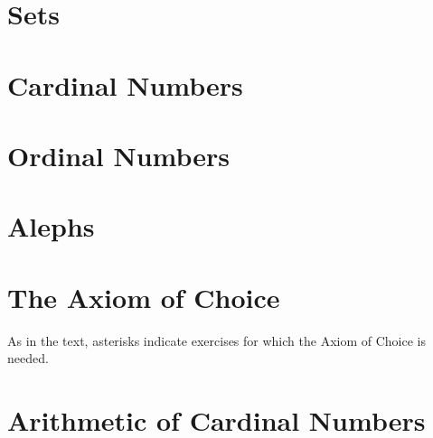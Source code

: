 \begin{questions}

  \setcounter{section}{1-1}

  \section{Sets}
  \setcounter{subsection}{3-1}
  
  

  \setcounter{section}{5-1}

  \section{Cardinal Numbers}
  
  

  \section{Ordinal Numbers}
  
  
  
  
  
  

  \section{Alephs}
  
  

  \section{The Axiom of Choice}
  As in the text, asterisks indicate exercises for which the Axiom of Choice is needed.
  
  

  \section{Arithmetic of Cardinal Numbers}
  

\end{questions}


